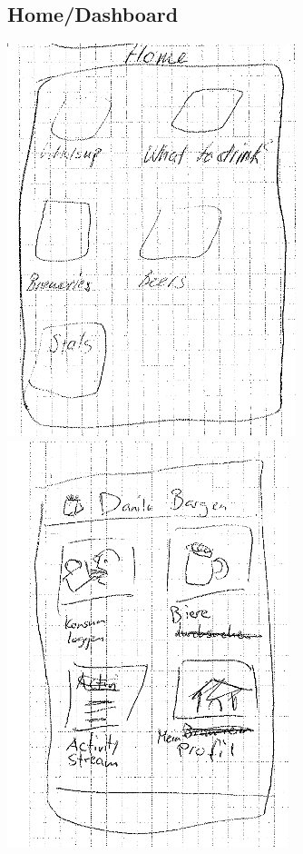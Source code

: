 \documentclass[10pt,a4paper]{scrartcl}
\begin{document}
\subsection{Home/Dashboard}
\includegraphics[scale=.5]{home-skizze.png}
\includegraphics[scale=.5]{home-skizze-2.png}
\end{document}
